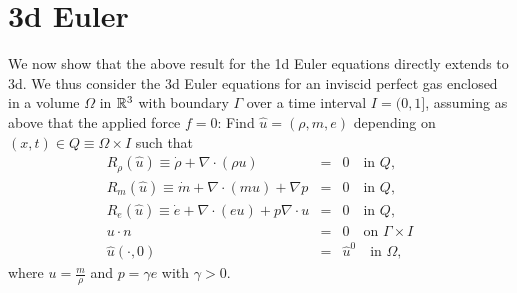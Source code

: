 












\normalsize

  


\section{3d Euler}

We now show that the above result for the 1d Euler equations
directly extends to 3d.
We thus consider the 3d Euler equations for an inviscid perfect gas 
enclosed in a volume $\Omega$ in ${\mathbb{R}}^3$ with boundary $\Gamma$
over a time interval $I=(0,1]$, assuming as above that the 
applied force $f=0$: 
Find $\hat u=(\rho ,m,e)$ 
depending on $(x,t)\in Q\equiv \Omega\times I$ such that
\begin{equation}\label{euler3d1}
\begin{array}{rcl}
R_\rho (\hat u)\equiv\dot \rho +\nabla\cdot (\rho u )&=&  0 \quad \mbox{in } Q, \\
R_m(\hat u)\equiv\dot m +\nabla\cdot (mu) +\nabla p&=&  0 \quad \mbox{in } Q, \\
R_e(\hat u)\equiv\dot e +\nabla\cdot (eu)+p\nabla\cdot u &=& 0  \quad \mbox{in } Q,\\ 
u\cdot n&=&0\quad \mbox{on } \Gamma\times I\\
\hat u(\cdot ,0)&=&\hat u^0\quad \mbox{in } \Omega , 
\end{array} 
\end{equation}
where $u=\frac{m}{\rho}$ and 
$p=\gamma e$ with $\gamma >0$. 




